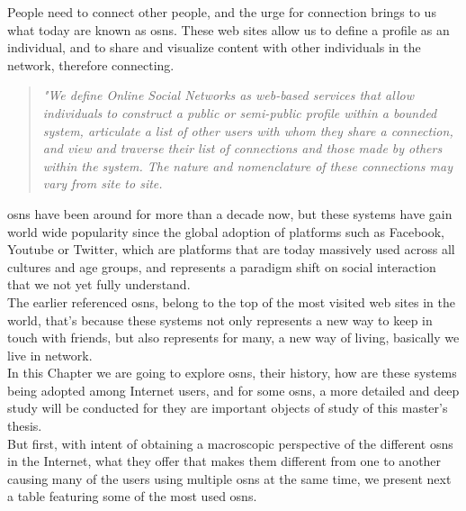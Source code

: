 People need to connect other people, and the urge for connection brings to us what today are known as \glspl{osn}.
These web sites allow us to define a profile as an individual, and to share and visualize content with other individuals in the network, therefore connecting.

\begin{quote}
\textit{"We define Online Social Networks as web-based services that allow individuals to construct a public or semi-public
 profile within a bounded system, articulate a list of other users with whom they share a connection, and view and traverse
 their list of connections and those made by others within the system. The nature and nomenclature of these connections
 may vary from site to site.} \citep{ellison2007social}
\end{quote}

\indent \glspl{osn} have been around for more than a decade now, but these systems have gain world wide popularity since the global adoption of
platforms such as Facebook, Youtube or Twitter, which are platforms that are today massively used across all cultures and age groups, and represents
a paradigm shift on social interaction that we not yet fully understand.\\
\indent The earlier referenced \glspl{osn}, belong to the top of the most visited web sites in the world, that's because these systems not only represents a new
way to keep in touch with friends, but also represents for many, a new way of living, basically we live in network.\\
\indent In this Chapter we are going to explore \glspl{osn}, their history, how are these systems being adopted among Internet users, and for some \glspl{osn},
a more detailed and deep study will be conducted for they are important objects of study of this master's thesis.\\
\indent But first, with intent of obtaining a macroscopic perspective of the different \glspl{osn} in the Internet, what they offer
that makes them different from one to another causing many of the users using multiple \glspl{osn} at the same time, we present next a table featuring some
of the most used \glspl{osn}.

